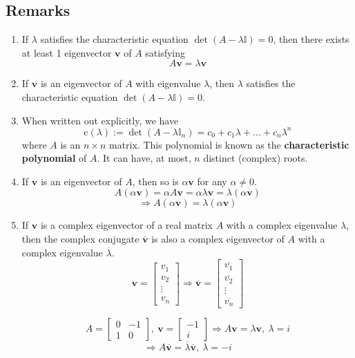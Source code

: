 \documentclass[11pt]{article}
\newcommand{\ident}{\mathbb{I}}
\renewcommand{\vec}[1]{\mathbf{#1}}
\begin{document}
\subsection{Remarks}
\begin{enumerate}[ (a) ]
\item If $\lambda$ satisfies the characteristic equation $\det(A - \lambda \ident)=0$, then there exists at least 1 eigenvector $\vec{v}$ of $A$ satisfying
\[ A \vec{v} = \lambda \vec{v} \]
\item If $\vec{v}$ is an eigenvector of $A$ with eigenvalue $\lambda$, then $\lambda$ satisfies the characteristic equation $\det(A - \lambda \ident)=0$.
\item When written out explicitly, we have
\[ \text{c}(\lambda) := \det(A - \lambda \ident _n) = c_0 + c_1 \lambda + ... + c_n \lambda^n \]
where $A$ is an $n \times n$ matrix. This polynomial is known as the \textbf{characteristic polynomial} of $A$. It can have, at most, $n$ distinct (complex) roots.
\item If $\vec{v}$ is an eigenvector of $A$, then so is $\alpha \vec{v}$ for any $\alpha \not = 0$.
\[ A(\alpha \vec{v}) = \alpha A \vec{v} = \alpha \lambda \vec{v} = \lambda (\alpha \vec{v}) \]
\[ \Rightarrow A(\alpha \vec{v}) = \lambda (\alpha \vec{v}) \]
\item If $\vec{v}$ is a complex eigenvector of a real matrix $A$ with a complex eigenvalue $\lambda$, then the complex conjugate $\overline{\vec{v}}$ is also a complex eigenvector of $A$ with a complex eigenvalue $\overline{\lambda}$.
\[ \vec{v} = \begin{bmatrix}
v_1 \\
v_2 \\
\vdots \\
v_n
\end{bmatrix} 
\Rightarrow \overline{\vec{v}} = \begin{bmatrix}
\overline{v_1} \\
\overline{v_2} \\
\vdots \\
\overline{v_n}
\end{bmatrix} 
\]

\[ 
A = \begin{bmatrix}
0 & -1 \\
1 & 0
\end{bmatrix},\ 
\vec{v} = \begin{bmatrix}
-1 \\
i
\end{bmatrix}
\Rightarrow A \vec{v} = \lambda \vec{v},\ \lambda = i
\]
\[ \Rightarrow A \overline{\vec{v}} = \overline{\lambda} \overline{\vec{v}},\ \overline{\lambda} = -i \]
\end{enumerate}
\end{document}
